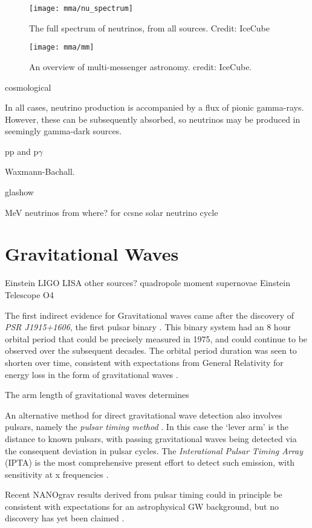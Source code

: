 \begin{figure}[!ht]
	\texttt{[image: mma/nu\_spectrum]}
	\caption{The full spectrum of neutrinos, from all sources. Credit: IceCube}
	\label{fig:nu_spectrum}
\end{figure}

\begin{figure}[!ht]
	\centering \texttt{[image: mma/mm]}
	\caption{An overview of multi-messenger astronomy. credit: IceCube.}
	\label{fig:mm}
\end{figure}

cosmological

In all cases, neutrino production is accompanied by a flux of pionic gamma-rays. However, these can be subsequently absorbed, so neutrinos may be produced in seemingly gamma-dark sources.

pp and p$\gamma$

Waxmann-Bachall.

glashow

MeV neutrinos from where? for ccsne
solar neutrino cycle

\section{Gravitational Waves}

Einstein
LIGO
LISA
other sources?
quadropole moment
supernovae
Einstein Telescope
O4

The first indirect evidence for Gravitational waves came after the discovery of \emph{PSR J1915+1606}, the first pulsar binary . This binary system had an 8 hour orbital period that could be precisely measured in 1975, and could continue to be observed over the subsequent decades. The orbital period duration was seen to shorten over time, consistent with expectations from General Relativity for energy loss in the form of gravitational waves . 

The arm length of gravitational waves determines 

An alternative method for direct gravitational wave detection also involves pulsars, namely the \emph{pulsar timing method} . In this case the `lever arm' is the distance to known pulsars, with passing gravitational waves being detected via the consequent deviation in pulsar cycles. The \emph{Interational Pulsar Timing Array} (IPTA) is the most comprehensive present effort to detect such emission, with sensitivity at x frequencies .

Recent NANOgrav results derived from pulsar timing could in principle be consistent with expectations for an astrophysical GW background, but no discovery has yet been claimed .